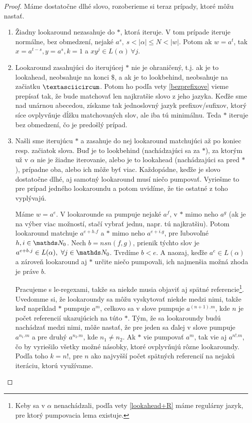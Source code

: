 \begin{proof}
Máme dostatočne dlhé slovo, rozoberieme si teraz prípady, ktoré môžu nastať. 
\begin{enumerate}
\item Žiadny lookaround nezasahuje do $*$, ktorá iteruje. V tom prípade iteruje normálne, bez obmedzení, nejaké $a^s, ~ s<\vert \alpha \vert \leq N < \vert w \vert$. Potom ak $w=a^t$, tak $x=a^{t-s},y=a^s, k=1$ a $xy^j \in L(\alpha) ~ \forall j$. 
\item Lookaround zasahujúci do iterujúcej $*$ nie je ohraničený, t.j. ak je to lookahead, neobsahuje na konci $\mathdollar$, a ak je to lookbehind, neobsahuje na začiatku $\textasciicircum$. Potom ho podľa vety \ref{bezprefixove} vieme prepísať tak, že bude matchovať len najkratšie slovo z jeho jazyka. Keďže sme nad unárnou abecedou, získame tak jednoslovný jazyk prefixov/sufixov, ktorý síce ovplyvňuje dĺžku matchovaných slov, ale iba tú minimálnu. Teda $*$ iteruje bez obmedzení, čo je predošlý prípad.
\item Našli sme iterujúcu $*$ a zasahuje do nej lookaround matchujúci až po koniec resp. začiatok slova. Buď je to lookbehind (nachádzajúci sa za $*$), za ktorým už v $\alpha$ nie je žiadne iterovanie, alebo je to lookahead (nachádzajúci sa pred $*$), prípadne oba, alebo ich môže byť viac. Každopádne, keďže je slovo dostatočne dlhé, aj samotný lookaround musí niečo pumpovať. Vyriešme to pre prípad jedného lookaroundu a potom uvidíme, že tie ostatné z toho vyplývajú.

Máme $w=a^e$. V lookarounde sa pumpuje nejaké $a^f$, v $*$ mimo neho $a^g$ (ak je na výber viac možností, stačí vybrať jednu, napr. tú najkratšiu). Potom lookaround matchuje $a^{e+h.f}$ a $*$ mimo neho $a^{e+i.g}$, pre ľubovoľné $h,i \in \N_0$. Nech $b = nsn(f,g)$, prienik týchto slov je $a^{e+b.j} \in L(\alpha), ~ \forall j \in \N_0$. Tvrdíme $b<e$. A naozaj, keďže $a^e \in L(\alpha)$ a zároveň lookaround aj $*$ určite niečo pumpovali, ich najmenšia možná zhoda je práve $b$.

Pracujeme s le-regexami, takže sa niekde musia objaviť aj spätné referencie\footnote{Keby sa v $\alpha$ nenachádzali, podľa vety \ref{lookahead+R} máme regulárny jazyk, pre ktorý pumpovacia lema existuje.}. Uvedomme si, že lookaroundy sa môžu vyskytovať niekde medzi nimi, takže keď napríklad $*$ pumpuje $a^m$, celkovo sa v slove pumpuje $a^{(n+1).m}$, kde $n$ je počet referencií ukazujúcich na túto $*$. Tým, že sa lookaroundy budú nachádzať medzi nimi, môže nastať, že pre jeden sa ďalej v slove pumpuje $a^{n_1.m}$ a pre druhý $a^{n_2.m}$, kde $n_1 \neq n_2$. Ak $*$ vie pumpovať $a^m$, tak vie aj $a^{n!.m}$, čo by vyriešilo všetky možné násobky, ktoré ovplyvňujú rôzne lookaroundy. Podľa toho $k = n!$, pre $n$ ako najvyšší počet spätných referencií na nejakú iteráciu, ktorú využívame.


\end{enumerate}
\end{proof}
